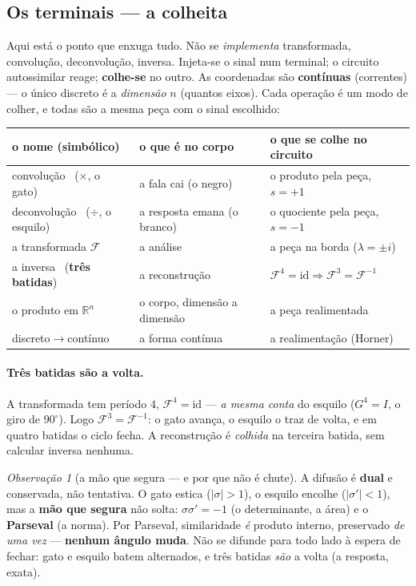 \documentclass[11pt]{article}
\theoremstyle{plain}
\theoremstyle{remark}
\newtheorem{observacao}[teorema]{Observação}
\begin{document}
\subsection{Os terminais --- a colheita}

Aqui está o ponto que enxuga tudo. Não se \emph{implementa} transformada, convolução, deconvolução,
inversa. Injeta-se o sinal num terminal; o circuito autossimilar reage; \textbf{colhe-se} no outro. As
coordenadas são \textbf{contínuas} (correntes) --- o único discreto é a \emph{dimensão} $n$
(quantos eixos). Cada operação é um modo de colher, e todas são a mesma peça com o sinal escolhido:

\begin{center}\small
\begin{tabular}{@{}lll@{}}
\toprule
o nome (simbólico) & o que é no corpo & o que se colhe no circuito \\
\midrule
convolução \ ($\times$, o gato) & a fala cai (o negro) & o produto pela peça, $s=+1$ \\
deconvolução \ ($\div$, o esquilo) & a resposta emana (o branco) & o quociente pela peça, $s=-1$ \\
a transformada $\mathcal F$ & a análise & a peça na borda ($\lambda=\pm i$) \\
a inversa \ (\textbf{três batidas}) & a reconstrução & $\mathcal F^4{=}\mathrm{id}\Rightarrow\mathcal F^3{=}\mathcal F^{-1}$ \\
o produto em $\mathbb{R}^n$ & o corpo, dimensão a dimensão & a peça realimentada \\
discreto$\to$contínuo & a forma contínua & a realimentação (Horner) \\
\bottomrule
\end{tabular}
\end{center}

\paragraph{Três batidas são a volta.} A transformada tem período $4$, $\mathcal F^4=\mathrm{id}$ ---
\emph{a mesma conta} do esquilo ($G^4=I$, o giro de $90^\circ$). Logo $\mathcal F^3=\mathcal F^{-1}$:
o gato avança, o esquilo o traz de volta, e em quatro batidas o ciclo fecha. A reconstrução é
\emph{colhida} na terceira batida, sem calcular inversa nenhuma.

\begin{observacao}[a mão que segura --- e por que não é chute]
A difusão é \textbf{dual} e conservada, não tentativa. O gato estica ($|\sigma|>1$), o esquilo
encolhe ($|\sigma'|<1$), mas a \textbf{mão que segura} não solta: $\sigma\sigma'=-1$ (o determinante,
a área) e o \textbf{Parseval} (a norma). Por Parseval, similaridade \emph{é} produto interno,
preservado \emph{de uma vez} --- \textbf{nenhum ângulo muda}. Não se difunde para todo lado à espera
de fechar: gato e esquilo batem alternados, e três batidas \emph{são} a volta (a resposta, exata).
\end{observacao}
\end{document}
